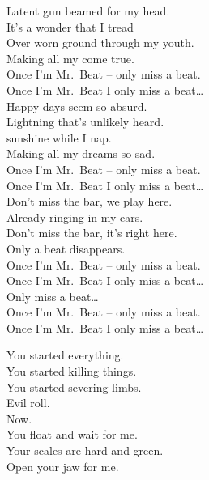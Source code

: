 Latent gun beamed for my head. \\
It's a wonder that I tread \\
Over worn ground through my youth. \\
Making all my  come true. \\

Once I'm Mr.~Beat -- only miss a beat. \\
Once I'm Mr.~Beat I only miss a beat… \\

Happy days seem so absurd. \\
Lightning that's unlikely heard. \\
 sunshine while I nap. \\
Making all my dreams so sad. \\

Once I'm Mr.~Beat -- only miss a beat. \\
Once I'm Mr.~Beat I only miss a beat… \\

Don't miss the bar, we play here. \\
Already ringing in my ears. \\
Don't miss the bar, it's right here. \\
Only a beat disappears. \\

Once I'm Mr.~Beat -- only miss a beat. \\
Once I'm Mr.~Beat I only miss a beat… \\

Only miss a beat… \\

Once I'm Mr.~Beat -- only miss a beat. \\
Once I'm Mr.~Beat I only miss a beat… \\




You started everything. \\
You started killing things. \\
You started severing limbs. \\

Evil  roll. \\
Now. \\

You float and wait for me. \\
Your scales are hard and green. \\
Open your jaw for me. \\

